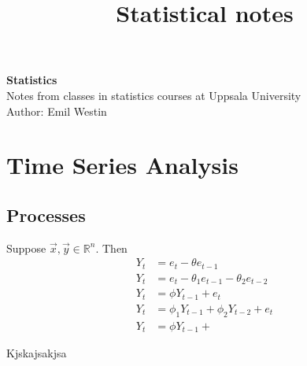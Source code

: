\documentclass[11pt]{article}
\begin{document}
\title{Statistical notes}

\thispagestyle{empty}

\begin{center}
{\LARGE \bf Statistics}\\
Notes from classes in statistics courses at Uppsala University \\
Author: Emil Westin
\end{center}

\section{Time Series Analysis}
\subsection{Processes}

Suppose $\vec{x},\vec{y} \in \mathbb{R}^n$. Then 
\begin{align}
Y_t & = e_t - \theta e_{t-1} \label{MA1} \\
Y_t & = e_t - \theta_1 e_{t-1} -  \theta_2 e_{t-2} \label{MA2} \\
Y_t & = \phi Y_{t-1} + e_t \label{AR1} \\
Y_t & = \phi_1 Y_{t-1} + \phi_2 Y_{t-2} + e_t \label{AR2} \\
Y_t & = \phi Y_{t-1} +  \label{ARMA} 
\end{align}

Kjskajsakjsa
\end{document}
